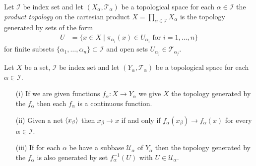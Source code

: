 \begin{defn}Let $\mathcal{I}$ be index set  and let $(X_\alpha,  \mathcal{T}_\alpha)$ be a topological space for each $\alpha \in \mathcal{I}$ the
\emph{product topology} on the  cartesian product $X = \prod_{\alpha \in \mathcal{I}} X_\alpha$ is the topology generated by sets of the 
form 
\begin{align*}
U &= \lbrace x \in X \mid \pi_{\alpha_i}(x) \in U_{\alpha_i} \text{ for $i=1, \dotsc, n$} \rbrace
\end{align*}
for finite subsets $\lbrace \alpha_1, \dotsc, \alpha_n \rbrace \subset \mathcal{I}$ and open sets $U_{\alpha_j} \in \mathcal{T}_{\alpha_j}$.
\end{defn}

\begin{lem}\label{TopologyGeneratedByFunctionsAndOpenMappings}Let $X$ be a set, $\mathcal{I}$ be index set  and let $(Y_\alpha,  \mathcal{T}_\alpha)$ be a topological space for each $\alpha \in \mathcal{I}$.  
\begin{itemize}
\item[(i)] If we are given functions $f_\alpha : X \to Y_\alpha$ we give $X$ the topology generated by the $f_\alpha$ then each $f_\alpha$ is a continuous function.  
\item [(ii)] Given a net $\langle x_{\beta} \rangle$ then $x_\beta \to x$ if and only if $f_\alpha(x_\beta) \to f_\alpha(x)$ for every $\alpha \in \mathcal{I}$.  
\item[(iii)] If for each $\alpha$ be have a subbase $\mathcal{U}_\alpha$ of $Y_\alpha$ then the topology generated by the $f_\alpha$ is also generated by set $f_\alpha^{-1}(U)$ with $U \in \mathcal{U}_\alpha$.
\end{itemize}
\end{lem}
